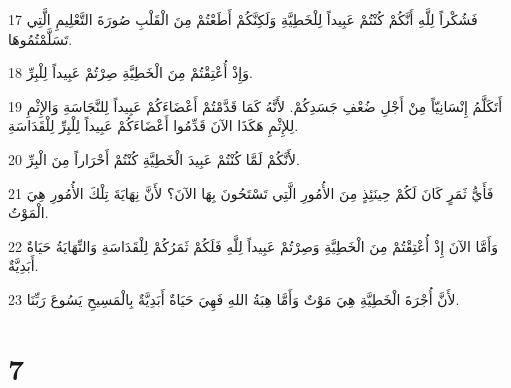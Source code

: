 \par 17 فَشُكْراً لِلَّهِ أَنَّكُمْ كُنْتُمْ عَبِيداً لِلْخَطِيَّةِ وَلَكِنَّكُمْ أَطَعْتُمْ مِنَ الْقَلْبِ صُورَةَ التَّعْلِيمِ الَّتِي تَسَلَّمْتُمُوهَا.
\par 18 وَإِذْ أُعْتِقْتُمْ مِنَ الْخَطِيَّةِ صِرْتُمْ عَبِيداً لِلْبِرِّ.
\par 19 أَتَكَلَّمُ إِنْسَانِيّاً مِنْ أَجْلِ ضُعْفِ جَسَدِكُمْ. لأَنَّهُ كَمَا قَدَّمْتُمْ أَعْضَاءَكُمْ عَبِيداً لِلنَّجَاسَةِ وَالإِثْمِ لِلإِثْمِ هَكَذَا الآنَ قَدِّمُوا أَعْضَاءَكُمْ عَبِيداً لِلْبِرِّ لِلْقَدَاسَةِ.
\par 20 لأَنَّكُمْ لَمَّا كُنْتُمْ عَبِيدَ الْخَطِيَّةِ كُنْتُمْ أَحْرَاراً مِنَ الْبِرِّ.
\par 21 فَأَيُّ ثَمَرٍ كَانَ لَكُمْ حِينَئِذٍ مِنَ الأُمُورِ الَّتِي تَسْتَحُونَ بِهَا الآنَ؟ لأَنَّ نِهَايَةَ تِلْكَ الأُمُورِ هِيَ الْمَوْتُ.
\par 22 وَأَمَّا الآنَ إِذْ أُعْتِقْتُمْ مِنَ الْخَطِيَّةِ وَصِرْتُمْ عَبِيداً لِلَّهِ فَلَكُمْ ثَمَرُكُمْ لِلْقَدَاسَةِ وَالنِّهَايَةُ حَيَاةٌ أَبَدِيَّةٌ.
\par 23 لأَنَّ أُجْرَةَ الْخَطِيَّةِ هِيَ مَوْتٌ وَأَمَّا هِبَةُ اللهِ فَهِيَ حَيَاةٌ أَبَدِيَّةٌ بِالْمَسِيحِ يَسُوعَ رَبِّنَا.

\chapter{7}

